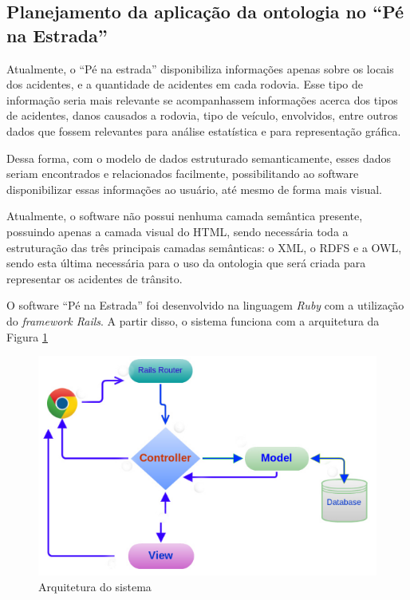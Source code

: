 \subsection{Planejamento da aplicação da ontologia no ``Pé na Estrada''}

Atualmente, o “Pé na estrada” disponibiliza informações apenas sobre os locais dos
acidentes, e a quantidade de acidentes em cada rodovia. Esse tipo de informação seria mais
relevante se acompanhassem informações acerca dos tipos de acidentes, danos causados a
rodovia, tipo de veículo, envolvidos, entre outros dados que fossem relevantes para análise
estatística e para representação gráfica.

Dessa forma, com o modelo de dados estruturado semanticamente, esses dados seriam
encontrados e relacionados facilmente, possibilitando ao software disponibilizar essas
informações ao usuário, até mesmo de forma mais visual.

Atualmente, o software não possui nenhuma camada semântica presente, possuindo
apenas a camada visual do HTML, sendo necessária toda a estruturação das três principais
camadas semânticas: o XML, o RDFS e a OWL, sendo esta última necessária para o uso da
ontologia que será criada para representar os acidentes de trânsito.

O software ``Pé na Estrada'' foi desenvolvido na linguagem \textit{Ruby} com a utilização do \textit{framework Rails}. 
A partir disso, o sistema funciona com a arquitetura da Figura \ref{fig:arquitetura}

\begin{figure}[!htb]
 \centering
 \includegraphics[scale = 0.7]{figuras/arquiteturarails.png}
 \caption{Arquitetura do sistema}
 \label{fig:arquitetura}

\end{figure}

